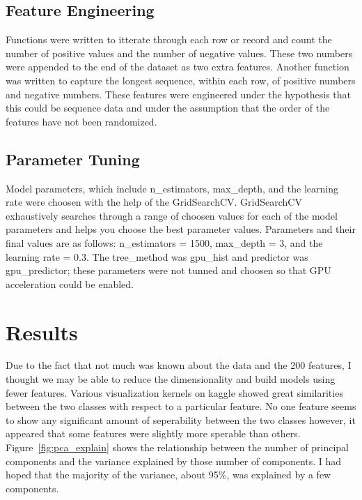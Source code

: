 \documentclass[11pt,letterpaper]{article}
\begin{document}
\subsection{Feature Engineering}
Functions were written to itterate through each row or record and count the
number of positive values and the number of negative values.  These two numbers
were appended to the end of the dataset as two extra features.  Another function
was written to capture the longest sequence, within each row, of positive
numbers and negative numbers.  These features were engineered under the
hypothesis that this could be sequence data and under the assumption that the
order of the features have not been randomized. 

\subsection{Parameter Tuning}
Model parameters, which include n\_estimators, max\_depth, and the learning rate
were choosen with the help of the GridSearchCV.  GridSearchCV exhaustively
searches through a range of choosen values for each of the model parameters and
helps you choose the best parameter values.  Parameters and their final values
are as follows: n\_estimators = 1500, max\_depth = 3, and the learning rate =
0.3. The tree\_method was gpu\_hist and predictor was gpu\_predictor; these
parameters were not tunned and choosen so that GPU acceleration could be
enabled.   

\section{Results}

Due to the fact that not much was known about the data and the 200 features, I
thought we may be able to reduce the dimensionality and build models using fewer
features.  Various visualization kernels on kaggle showed great similarities
between the two classes with respect to a particular feature.  No one feature
seems to show any significant amount of seperability between the two classes
however, it appeared that some features were slightly more sperable than others.
Figure~\ref{fig:pca_explain} shows the relationship between the number of
principal components and the variance explained by those number of components.
I had hoped that the majority of the variance, about 95\%, was explained by a
few components.
\end{document}
